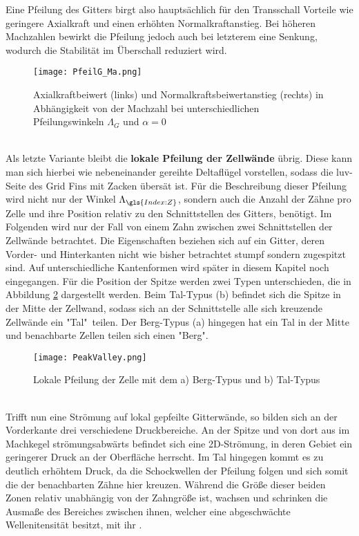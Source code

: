 Eine Pfeilung des Gitters birgt also hauptsächlich für den Transschall Vorteile wie geringere Axialkraft und einen erhöhten Normalkraftanstieg. Bei höheren Machzahlen bewirkt die Pfeilung jedoch auch bei letzterem eine Senkung, wodurch die Stabilität im Überschall reduziert wird.
\begin{figure}[h]
	\centering
	\texttt{[image: PfeilG\_Ma.png]}
	\begin{flushright}
	\end{flushright}
	\caption{Axialkraftbeiwert (links) und Normalkraftsbeiwertanstieg (rechts) in Abhängigkeit von der Machzahl bei unterschiedlichen Pfeilungswinkeln $\Lambda_{G}$ und $\alpha = 0$}
	\label{abb_PfeilG-Ma}
\end{figure}\\
Als letzte Variante bleibt die \textbf{lokale Pfeilung der Zellwände} übrig. Diese kann man sich hierbei wie nebeneinander gereihte Deltaflügel vorstellen, sodass die luv-Seite des Grid Fins mit Zacken übersät ist. Für die Beschreibung dieser Pfeilung wird nicht nur der Winkel $\Lambda_{\gls{Index:Z}}$, sondern auch die Anzahl der Zähne pro Zelle und ihre Position relativ zu den Schnittstellen des Gitters, benötigt. Im Folgenden wird nur der Fall von einem Zahn zwischen zwei Schnittstellen der Zellwände betrachtet. Die Eigenschaften beziehen sich auf ein Gitter, deren Vorder- und Hinterkanten nicht wie bisher betrachtet stumpf sondern zugespitzt sind. Auf unterschiedliche Kantenformen wird später in diesem Kapitel noch eingegangen. Für die Position der Spitze werden zwei Typen unterschieden, die in Abbildung \ref{abb_BergTal} dargestellt werden. Beim Tal-Typus (b) befindet sich die Spitze in der Mitte der Zellwand, sodass sich an der Schnittstelle alle sich kreuzende Zellwände ein "Tal"\ teilen. Der Berg-Typus (a) hingegen hat ein Tal in der Mitte und benachbarte Zellen teilen sich einen "Berg".
\begin{figure}[h]
	\centering
	\texttt{[image: PeakValley.png]}
	\begin{flushright}
			\flushbottom{Quelle: \cite{PeakValley}}
	\end{flushright}
	\caption{Lokale Pfeilung der Zelle mit dem a) \grqq Berg\grqq -Typus und b) \grqq Tal\grqq -Typus}
	\label{abb_BergTal}
\end{figure}\\
Trifft nun eine Strömung auf lokal gepfeilte Gitterwände, so bilden sich an der Vorderkante drei verschiedene Druckbereiche. An der Spitze und von dort aus im Machkegel strömungsabwärts befindet sich eine 2D-Strömung, in deren Gebiet ein geringerer Druck an der Oberfläche herrscht. Im Tal hingegen kommt es zu deutlich erhöhtem Druck, da die Schockwellen der Pfeilung folgen und sich somit die der benachbarten Zähne hier kreuzen. Während die Größe dieser beiden Zonen relativ unabhängig von der Zahngröße ist, wachsen und schrinken die Ausmaße des Bereiches zwischen ihnen, welcher eine abgeschwächte Wellenitensität besitzt, mit ihr \cite{PeakValley}.

